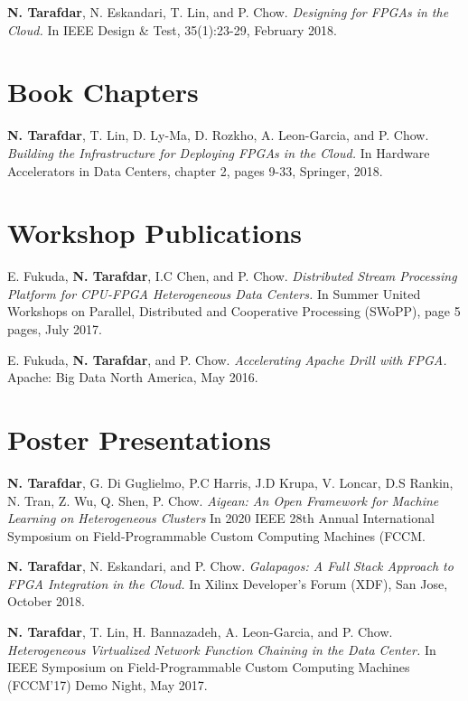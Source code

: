\onecol
{
  \textbf{N. Tarafdar}, N. Eskandari, T. Lin, and P. Chow. 
  \textit{Designing for FPGAs in the Cloud.}
  In IEEE Design \& Test, 35(1):23-29, February 2018.
}


\section{\sc Book Chapters}

\onecol
{
    \textbf{N. Tarafdar}, T. Lin, D. Ly-Ma, D. Rozkho, A. Leon-Garcia, and P. Chow.
    \textit{Building the Infrastructure for Deploying FPGAs in the Cloud.}
    In Hardware Accelerators in Data Centers, chapter 2, pages 9-33, Springer, 2018.
}



\section{\sc Workshop Publications}

\onecol
{
  E. Fukuda, \textbf{N. Tarafdar}, I.C Chen, and P. Chow.
  \textit{Distributed Stream Processing Platform for CPU-FPGA Heterogeneous Data Centers.}
  In Summer United Workshops on Parallel, Distributed and Cooperative Processing (SWoPP), page 5 pages, July 2017.
}

\onecol
{
  E. Fukuda, \textbf{N. Tarafdar}, and P. Chow.
  \textit{Accelerating Apache Drill with FPGA.}
  Apache: Big Data North America, May 2016.
}


\section{\sc Poster Presentations}

\onecol
{
    \textbf{N. Tarafdar}, G. Di Guglielmo, P.C Harris, J.D Krupa, V. Loncar, D.S Rankin, N. Tran, Z. Wu, Q. Shen, P. Chow.
    \textit{Aigean: An Open Framework for Machine Learning on Heterogeneous Clusters}
    In 2020 IEEE 28th Annual International Symposium on Field-Programmable Custom Computing Machines (FCCM.
}


\onecol
{
    \textbf{N. Tarafdar}, N. Eskandari, and P. Chow.
    \textit{Galapagos: A Full Stack Approach to FPGA Integration in the Cloud.}
    In Xilinx Developer's Forum (XDF), San Jose, October 2018. 
}



\onecol
{
    \textbf{N. Tarafdar}, T. Lin, H. Bannazadeh, A. Leon-Garcia, and P. Chow.
    \textit{Heterogeneous Virtualized Network Function Chaining in the Data Center.}
    In IEEE Symposium on Field-Programmable Custom Computing Machines (FCCM'17) Demo Night, May 2017. 
}


